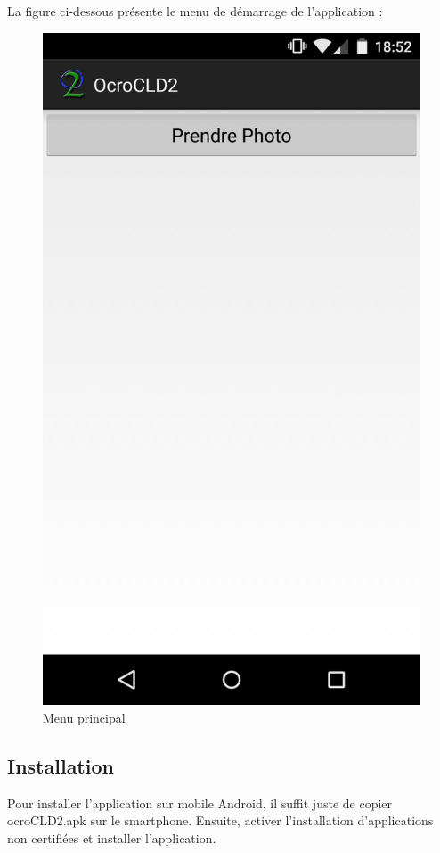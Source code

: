 La figure ci-dessous présente le menu de démarrage de l'application : 
	\begin{figure}[H]
		\centering
		\includegraphics[scale=0.1]{images/appliMenu.png}
		\caption{Menu principal}
		\label{fig:image}
	\end{figure}

\subsection{Installation}
Pour installer l'application sur mobile Android, il suffit juste de copier ocroCLD2.apk sur le smartphone. Ensuite, activer l'installation d'applications non certifiées et installer l'application.

